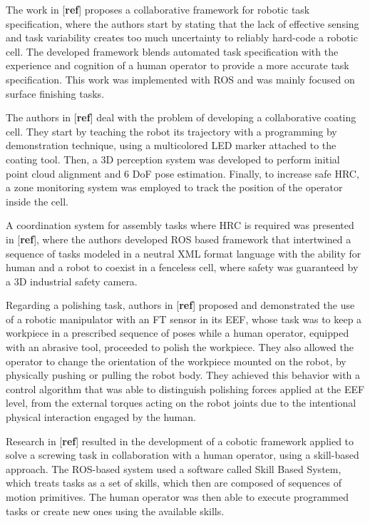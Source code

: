 \par The work in [\textbf{ref}] proposes a collaborative framework for robotic task specification, where the authors start by stating that the lack of effective sensing and task variability creates too much uncertainty to reliably hard-code a robotic cell. The developed framework blends automated task specification with the experience and cognition of a human operator to provide a more accurate task specification. This work was implemented with ROS and was mainly focused on surface finishing tasks.
\par The authors in [\textbf{ref}] deal with the problem of developing a collaborative coating cell. They start by teaching the robot its trajectory with a programming by demonstration technique, using a multicolored LED marker attached to the coating tool. Then, a 3D perception system was developed to perform initial point cloud alignment and 6 DoF pose estimation. Finally, to increase safe HRC, a zone monitoring system was employed to track the position of the operator inside the cell.
\par A coordination system for assembly tasks where HRC is required was presented in [\textbf{ref}], where the authors developed ROS based framework that intertwined a sequence of tasks modeled in a neutral XML format language with the ability for human and a robot to coexist in a fenceless cell, where safety was guaranteed by a 3D industrial safety camera.
\par Regarding a polishing task, authors in [\textbf{ref}] proposed and demonstrated the use of a robotic manipulator with an FT sensor in its EEF, whose task was to keep a workpiece in a prescribed sequence of poses while a human operator, equipped with an abrasive tool, proceeded to polish the workpiece. They also allowed the operator to change the orientation of the workpiece mounted on the robot, by physically pushing or pulling the robot body. They achieved this behavior with a control algorithm that was able to distinguish polishing forces applied at the EEF level, from the external torques acting on the robot joints due to the intentional physical interaction engaged by the human.
\par Research in [\textbf{ref}] resulted in the development of a cobotic framework applied to solve a screwing task in collaboration with a human operator, using a skill-based approach. The ROS-based system used a software called Skill Based System, which treats tasks as a set of skills, which then are composed of sequences of motion primitives. The human operator was then able to execute programmed tasks or create new ones using the available skills.
